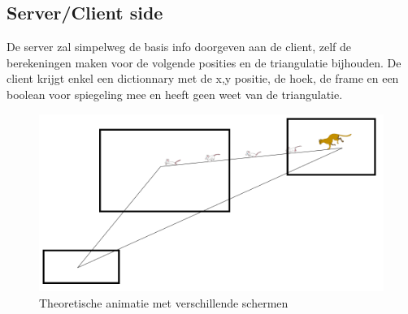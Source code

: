 \subsection{Server/Client side}

De server zal simpelweg de basis info doorgeven aan de client, zelf de berekeningen maken voor de volgende posities en de triangulatie bijhouden. De client krijgt enkel een dictionnary met de x,y positie, de hoek, de frame en een boolean voor spiegeling mee en heeft geen weet van de triangulatie.

\begin{figure}[H]
\centering
\includegraphics[scale=0.5]{img/schermen.png}
\caption{Theoretische animatie met verschillende schermen}
\label{fig:schermen}
\end{figure}

